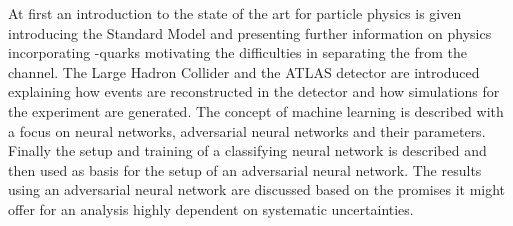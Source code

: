 At first an introduction to the state of the art for particle physics is given introducing the Standard Model and presenting further information on physics incorporating \Ptop -quarks motivating the difficulties in separating the \tW from the \ttbar channel.
The Large Hadron Collider and the ATLAS detector are introduced explaining how events are reconstructed in the detector and how simulations for the experiment are generated.
The concept of machine learning is described with a focus on neural networks, adversarial neural networks and their parameters.
Finally the setup and training of a classifying neural network is described and then used as basis for the setup of an adversarial neural network.
The results using an adversarial neural network are discussed based on the promises it might offer for an analysis highly dependent on systematic uncertainties.



